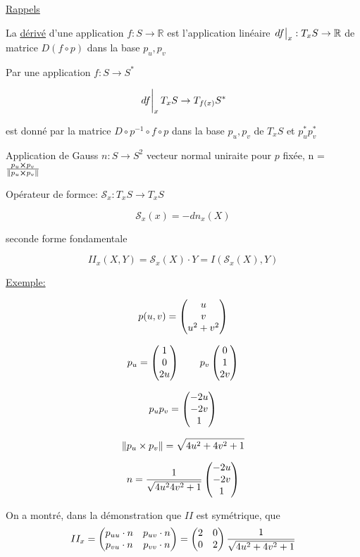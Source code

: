 




\underline{Rappels} 

La \underline{dérivé} d'une application $f: S \to \mathbb{R}$ est l'application linéaire $\eval{df}_{x}:T_{x} S \to \mathbb{R} $ de matrice $D(f\circ p)$ dans la base $p_{u}, p_{v} $ 



Par une application $f: S \to S^*$ 

$$\eval{df}_{x} T_{x} S \to T_{f(x)} S^*$$

est donné par la matrice $D\circ p^{-1} \circ f \circ p$ dans la base $p_{u}, p_{v} $ de $T_xS$ et $p_{u}^* p_{v}^*$ 

Application de Gauss $n: S \to S^2$ vecteur normal uniraite pour $p$ fixée, n = $\frac{p_{u}\cross p_{v}}{\norm{ p_{u}\cross p_v}}$ 



Opérateur de formce: $\mathcal{S}_x: T_{x} S \to T_{x} S$ 


$$\mathcal{S}_x(x) = -dn_{x} (X)$$ 

seconde forme fondamentale

$$II_x(X,Y) = \mathcal{S}_x(X) \cdot Y = I( \mathcal{S}_x(X), Y)$$ 


\underline{Exemple:} 


$$p(u,v) = \begin{pmatrix} u\\v\\u^2 + v^2 \end{pmatrix}$$ 

$$p_{u} = \begin{pmatrix} 1\\0\\2u \end{pmatrix} \qquad p_{v}  \begin{pmatrix} 0\\1\\2v \end{pmatrix}$$ 



$$p_{u} p_{v} = \begin{pmatrix} -2u\\ -2v \\1  \end{pmatrix}$$ 

$$\norm{p_{u} \times p_{v}} = \sqrt{4u^2+4v^2+1}$$ 

$$n = \frac{1}{\sqrt{4u^24v^2+1}} \begin{pmatrix} -2u\\ -2v\\ 1 \end{pmatrix}$$ 



On a montré, dans la démonstration que $II$ est symétrique,  que $$II_{x} = \begin{pmatrix} p_{uu} \cdot n & p_{uv} \cdot n\\ p_{vu} \cdot n & p_{vv} \cdot n \end{pmatrix} = \begin{pmatrix} 2&0\\0&2 \end{pmatrix} \frac{1}{\sqrt{4u^2+4v^2+1}}$$ 




